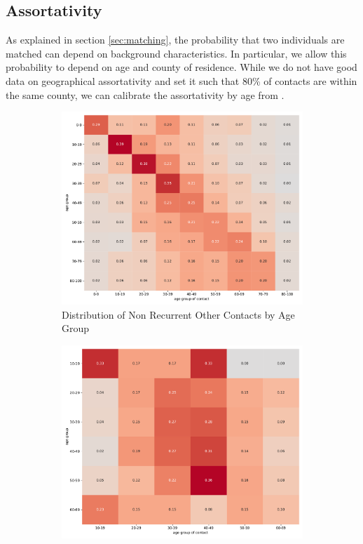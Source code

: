 \subsection{Assortativity}
\label{subsec:assortativity}

As explained in section \ref{sec:matching}, the probability that two individuals are
matched can depend on background characteristics. In particular, we allow this
probability to depend on age and county of residence. While we do not have good data on
geographical assortativity and set it such that 80\% of contacts are within the same
county, we can calibrate the assortativity by age from \cite{Mossong2008}.

\begin{figure}[ht]
    \centering
    \begin{subfigure}[b]{0.425\textwidth}
        \centering
        \includegraphics[width=\textwidth]{figures/results/figures/data/assortativity_other_non_recurrent}
        \caption{{Distribution of Non Recurrent Other Contacts by Age Group}}
        \label{fig:assortativity_other}
    \end{subfigure}
    \hfill
    \begin{subfigure}[b]{0.425\textwidth}
        \centering
        \includegraphics[width=0.9 \textwidth]{figures/results/figures/data/assortativity_work_non_recurrent}

\end{subfigure}
\end{figure}
